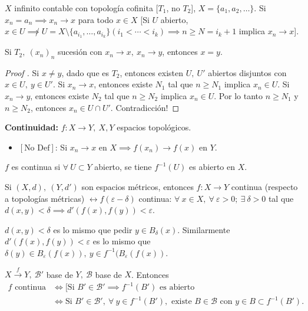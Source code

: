 	\begin{eg}
		$X$ infinito contable con topología cofinita [$T_1$, no $T_2$], $X = \{ a_1, a_2, \dots \}$. Si $x_n = a_n \implies x_n \to x$ para todo $x \in X$ [Si $U$ abierto, $x \in U \not\implies U = X \setminus \{a_{i_1},\dots, a_{i_k} \} (i_1<\cdots<i_k) \implies n \geq N = i_k + 1$ implica $x_n \to x$].   
	\end{eg}

	\begin{lemma}
		Si $T_2,\ (x_n)_n$ sucesión con $x_n \to x,\ x_n \to y$, entonces $x = y$.
	\end{lemma}

	\begin{proof}[Proof ]
		Si $x \neq y$, dado que es $T_2$, entonces existen $U,\ U'$ abiertos disjuntos con $x \in U,\ y \in U'$. Si $x_n \to x$, entonces existe $N_1$ tal que $n \geq N_1$ implica $x_n \in U$. Si $x_n \to y$, entonces existe $N_2$ tal que $n\geq N_2$ implica $x_n \in U$. Por lo tanto $n \geq N_1$ y $n \geq N_2$, entonces $x_n \in U \cap U'$. Contradicción! \textreferencemark
	\end{proof}

	\noindent \textbf{Continuidad: } $f: X \to Y,\ X,Y$ espacios topológicos.
	\begin{itemize}
		\item $[\text{No Def}]$: Si $x_n \to x$ en $X \implies f(x_n) \to f(x)$ en $Y$.
	\end{itemize}
	\begin{definition}[continuidad]
		$f$ es continua si $\forall \ U \subset Y$ abierto, se tiene $f^{-1} (U)$ es abierto en $X$.
	\end{definition}

	\begin{eg}
		Si $(X,d),\ (Y,d')$ son espacios métricos, entonces $f:X \to Y$ continua (respecto a topologías métricas) $\longleftrightarrow f(\varepsilon - \delta)$ continua: $\forall\ x \in X,\ \forall \ \varepsilon > 0;\ \exists \ \delta > 0$ tal que $d(x,y) < \delta \implies d'(f(x),f(y)) < \varepsilon$.
	\end{eg}
	\begin{remark}
		$d(x,y)<\delta$ es lo mismo que pedir $y \in B_{\delta}(x)$. Similarmente $d'(f(x),f(y))<\varepsilon$ es lo mismo que $\delta (y) \in B_{\varepsilon}(f(x)), \ y \in f^{-1}(B_{\varepsilon}(f(x))$.
	\end{remark}

	\begin{lemma}
		$X \xrightarrow{f} Y,\ \mathcal{B}'$ base de $Y, \ \mathcal{B}$ base de $X$. Entonces
		\begin{align*}
			f \text{ continua} & \iff [\text{Si } B' \in \mathcal{B}' \implies f^{-1}(B') \text{ es abierto} \\
			& \iff \text{Si } B' \in \mathcal{B}',\ \forall\ y \in f^{-1}(B'), \text{ existe } B \in \mathcal{B} \text{ con } y \in B \subset f^{-1}(B')
		.\end{align*}
	\end{lemma}


